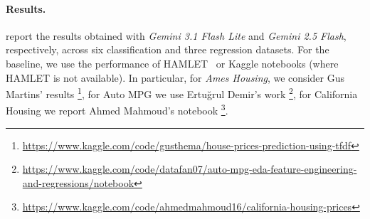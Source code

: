 \documentclass[runningheads]{llncs}
\newcommand{\sidenote}[3]{\todo[linecolor=#1,backgroundcolor=#1!25,bordercolor=#1,size=\tiny]{\textbf{#2:} #3}}
\newcommand{\gcsidenote}[1]{\sidenote{green}{Gio}{#1}}
\begin{document}

\paragraph{Results.}
\label{subsec:results}







 report
the results obtained with \textit{Gemini 3.1 Flash Lite} and \textit{Gemini 2.5 Flash},
respectively,
across six classification and three regression datasets.
%
For the baseline,
we use the performance of HAMLET~\cite{FranciaGP23} or Kaggle notebooks (where HAMLET is not available).
%
In particular,
for \textit{Ames Housing},
we consider Gus Martins' results%
\footnote{\url{https://www.kaggle.com/code/gusthema/house-prices-prediction-using-tfdf}},
for Auto MPG we use Ertu\u{g}rul Demir's work%
\footnote{\url{https://www.kaggle.com/code/datafan07/auto-mpg-eda-feature-engineering-and-regressions/notebook}},
for California Housing we report Ahmed Mahmoud's notebook%
\footnote{\url{https://www.kaggle.com/code/ahmedmahmoud16/california-housing-prices}}.
\end{document}
